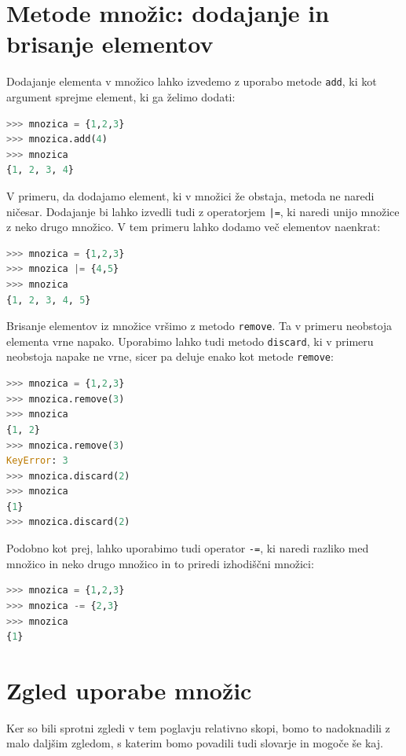 \section{Metode množic: dodajanje in brisanje elementov}
Dodajanje elementa v množico lahko izvedemo z uporabo metode \texttt{add}, ki kot argument sprejme element, ki ga želimo dodati:
\begin{lstlisting}[language=Python]
>>> mnozica = {1,2,3}
>>> mnozica.add(4)
>>> mnozica
{1, 2, 3, 4}
\end{lstlisting}
V primeru, da dodajamo element, ki v množici že obstaja, metoda ne naredi ničesar. Dodajanje bi lahko izvedli tudi z operatorjem \texttt{|=}, ki naredi unijo množice z neko drugo množico. V tem primeru lahko dodamo več elementov naenkrat:
\begin{lstlisting}[language=Python]
>>> mnozica = {1,2,3}
>>> mnozica |= {4,5}
>>> mnozica
{1, 2, 3, 4, 5}
\end{lstlisting}

Brisanje elementov iz množice vršimo z metodo \texttt{remove}. Ta v primeru neobstoja elementa vrne napako. Uporabimo lahko tudi metodo \texttt{discard}, ki v primeru neobstoja napake ne vrne, sicer pa deluje enako kot metode \texttt{remove}:
\begin{lstlisting}[language=Python]
>>> mnozica = {1,2,3}
>>> mnozica.remove(3)
>>> mnozica
{1, 2}
>>> mnozica.remove(3)
KeyError: 3
>>> mnozica.discard(2)
>>> mnozica
{1}
>>> mnozica.discard(2)
\end{lstlisting}
Podobno kot prej, lahko uporabimo tudi operator \texttt{-=}, ki naredi razliko med množico in neko drugo množico in to priredi izhodiščni množici:
\begin{lstlisting}[language=Python]
>>> mnozica = {1,2,3}
>>> mnozica -= {2,3}
>>> mnozica
{1}
\end{lstlisting}

\section{Zgled uporabe množic}
Ker so bili sprotni zgledi v tem poglavju relativno skopi, bomo to nadoknadili z malo daljšim zgledom, s katerim bomo povadili tudi slovarje in mogoče še kaj. 

